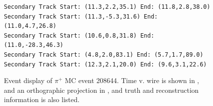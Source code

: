 \documentclass[letterpaper,12pt]{article}
\newcommand{\pip}{\ensuremath{\pi^{+}}}
\begin{document}
\begin{figure}[!hbtp]
\begin{center}
\begin{lstlisting}
Secondary Track Start: (11.3,2.2,35.1) End: (11.8,2.8,38.0)
Secondary Track Start: (11.3,-5.3,31.6) End: (11.0,4.7,26.8)
Secondary Track Start: (10.6,0.8,31.8) End: (11.0,-28.3,46.3)
Secondary Track Start: (4.8,2.0,83.1) End: (5.7,1.7,89.0)
Secondary Track Start: (12.3,2.1,20.0) End: (9.6,3.1,22.6)
\end{lstlisting}
    \caption{%
                Event display of \pip{} MC event 208644. 
                Time v. wire is shown in , 
                and an orthographic projection in ,
                and truth and reconstruction information is also listed.
            }
    \label{fig:evd_pipMC_208644}
  \end{center}
\end{figure}

\begin{figure}[!hbtp]
  \begin{center}
\end{center}
\end{figure}
\end{document}

